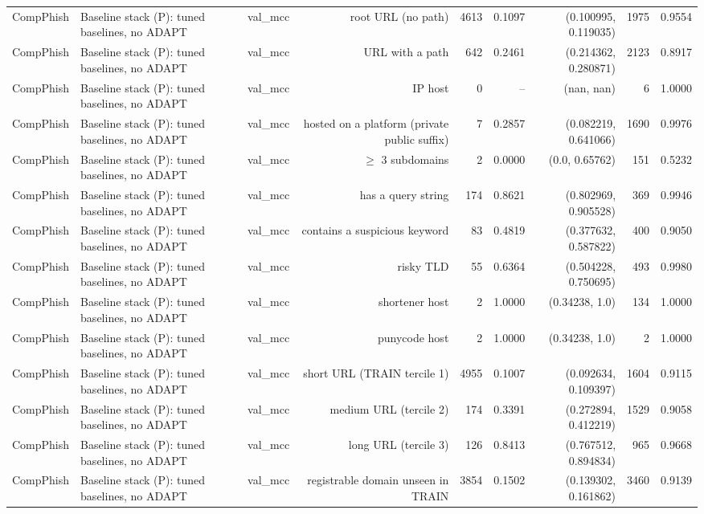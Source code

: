 \begin{table}[t]
\begin{tabular}{llrrrrrrr}
CompPhish & Baseline stack (P): tuned baselines, no ADAPT & val\_mcc & root URL (no path) & 4613 & 0.1097 & (0.100995, 0.119035) & 1975 & 0.9554 \\
CompPhish & Baseline stack (P): tuned baselines, no ADAPT & val\_mcc & URL with a path & 642 & 0.2461 & (0.214362, 0.280871) & 2123 & 0.8917 \\
CompPhish & Baseline stack (P): tuned baselines, no ADAPT & val\_mcc & IP host & 0 & -- & (nan, nan) & 6 & 1.0000 \\
CompPhish & Baseline stack (P): tuned baselines, no ADAPT & val\_mcc & hosted on a platform (private public suffix) & 7 & 0.2857 & (0.082219, 0.641066) & 1690 & 0.9976 \\
CompPhish & Baseline stack (P): tuned baselines, no ADAPT & val\_mcc & $\geq$ 3 subdomains & 2 & 0.0000 & (0.0, 0.65762) & 151 & 0.5232 \\
CompPhish & Baseline stack (P): tuned baselines, no ADAPT & val\_mcc & has a query string & 174 & 0.8621 & (0.802969, 0.905528) & 369 & 0.9946 \\
CompPhish & Baseline stack (P): tuned baselines, no ADAPT & val\_mcc & contains a suspicious keyword & 83 & 0.4819 & (0.377632, 0.587822) & 400 & 0.9050 \\
CompPhish & Baseline stack (P): tuned baselines, no ADAPT & val\_mcc & risky TLD & 55 & 0.6364 & (0.504228, 0.750695) & 493 & 0.9980 \\
CompPhish & Baseline stack (P): tuned baselines, no ADAPT & val\_mcc & shortener host & 2 & 1.0000 & (0.34238, 1.0) & 134 & 1.0000 \\
CompPhish & Baseline stack (P): tuned baselines, no ADAPT & val\_mcc & punycode host & 2 & 1.0000 & (0.34238, 1.0) & 2 & 1.0000 \\
CompPhish & Baseline stack (P): tuned baselines, no ADAPT & val\_mcc & short URL (TRAIN tercile 1) & 4955 & 0.1007 & (0.092634, 0.109397) & 1604 & 0.9115 \\
CompPhish & Baseline stack (P): tuned baselines, no ADAPT & val\_mcc & medium URL (tercile 2) & 174 & 0.3391 & (0.272894, 0.412219) & 1529 & 0.9058 \\
CompPhish & Baseline stack (P): tuned baselines, no ADAPT & val\_mcc & long URL (tercile 3) & 126 & 0.8413 & (0.767512, 0.894834) & 965 & 0.9668 \\
CompPhish & Baseline stack (P): tuned baselines, no ADAPT & val\_mcc & registrable domain unseen in TRAIN & 3854 & 0.1502 & (0.139302, 0.161862) & 3460 & 0.9139 \\

\end{tabular}
\end{table}
